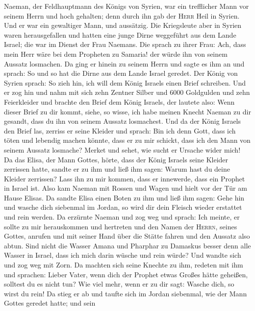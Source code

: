  Naeman, der Feldhauptmann des Königs von Syrien, war ein
trefflicher Mann vor seinem Herrn und hoch gehalten; denn durch ihn gab
der \textsc{Herr} Heil in Syrien. Und er war ein gewaltiger Mann, und
aussätzig.  Die Kriegsleute aber in Syrien waren
herausgefallen und hatten eine junge Dirne weggeführt aus dem Lande
Israel; die war im Dienst der Frau Naemans.  Die sprach zu
ihrer Frau: Ach, dass mein Herr wäre bei dem Propheten zu Samaria! der
würde ihn von seinem Aussatz losmachen.  Da ging er hinein
zu seinem Herrn und sagte es ihm an und sprach: So und so hat die Dirne
aus dem Lande Israel geredet.  Der König von Syrien
sprach: So zieh hin, ich will dem König Israels einen Brief schreiben.
Und er zog hin und nahm mit sich zehn Zentner Silber und 6000 Goldgulden
und zehn Feierkleider  und brachte den Brief dem König
Israels, der lautete also: Wenn dieser Brief zu dir kommt, siehe, so
wisse, ich habe meinen Knecht Naeman zu dir gesandt, dass du ihn von
seinem Aussatz losmachest.  Und da der König Israels den
Brief las, zerriss er seine Kleider und sprach: Bin ich denn Gott, dass
ich töten und lebendig machen könnte, dass er zu mir schickt, dass ich
den Mann von seinem Aussatz losmache? Merket und sehet, wie sucht er
Ursache wider mich!  Da das Elisa, der Mann Gottes, hörte,
dass der König Israels seine Kleider zerrissen hatte, sandte er zu ihm
und ließ ihm sagen: Warum hast du deine Kleider zerrissen? Lass ihn zu
mir kommen, dass er innewerde, dass ein Prophet in Israel ist.
 Also kam Naeman mit Rossen und Wagen und hielt vor der
Tür am Hause Elisas.  Da sandte Elisa einen Boten zu ihm
und ließ ihm sagen: Gehe hin und wasche dich siebenmal im Jordan, so
wird dir dein Fleisch wieder erstattet und rein werden. 
Da erzürnte Naeman und zog weg und sprach: Ich meinte, er sollte zu mir
herauskommen und hertreten und den Namen der \textsc{Herrn}, seines
Gottes, anrufen und mit seiner Hand über die Stätte fahren und den
Aussatz also abtun.  Sind nicht die Wasser Amana und
Pharphar zu Damaskus besser denn alle Wasser in Israel, dass ich mich
darin wüsche und rein würde? Und wandte sich und zog weg mit Zorn.
 Da machten sich seine Knechte zu ihm, redeten mit ihm
und sprachen: Lieber Vater, wenn dich der Prophet etwas Großes hätte
geheißen, solltest du es nicht tun? Wie viel mehr, wenn er zu dir sagt:
Wasche dich, so wirst du rein!  Da stieg er ab und taufte
sich im Jordan siebenmal, wie der Mann Gottes geredet hatte; und sein
